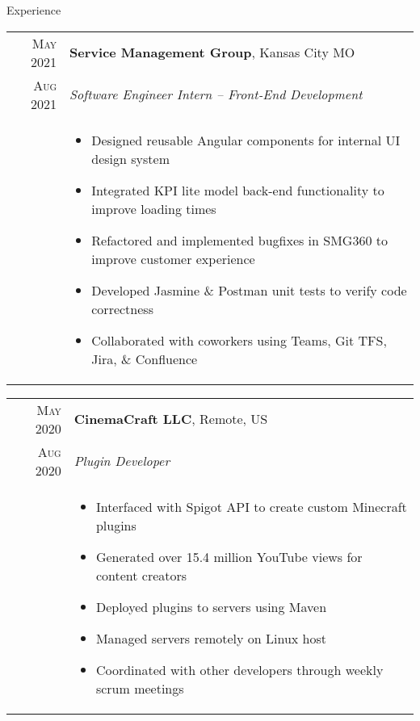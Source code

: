 \documentclass{resume}
\begin{document}
\begin{rSection}{Experience}
\small
{
  \begin{tabular}{r|p{15cm}}
    \textsc{May 2021} & \textbf{Service Management Group}, Kansas City MO \\
    \textsc{Aug 2021}  & \textit{Software Engineer Intern – Front-End Development} \\ &
    \begin{itemize}
      \item {Designed reusable Angular components for internal UI design system }
      \item {Integrated KPI lite model back-end functionality to improve loading times}
      \item {Refactored and implemented bugfixes in SMG360 to improve customer experience}
      \item {Developed Jasmine \& Postman unit tests to verify code correctness}
      \item {Collaborated with coworkers using Teams, Git TFS, Jira, \& Confluence}
    \end{itemize}
  \end{tabular}
  
  \begin{tabular}{r|p{15cm}}
    \textsc{May 2020} & \textbf{CinemaCraft LLC}, Remote, US \\
    \textsc{Aug 2020}  & \textit{Plugin Developer} \\ &
    \begin{itemize}
      \item {Interfaced with Spigot API to create custom Minecraft plugins}
      \item {Generated over 15.4 million YouTube views for content creators}
      \item {Deployed plugins to servers using Maven}
      \item {Managed servers remotely on Linux host}
      \item {Coordinated with other developers through weekly scrum meetings}
    \end{itemize}
  \end{tabular}

}
\end{rSection}
\end{document}
